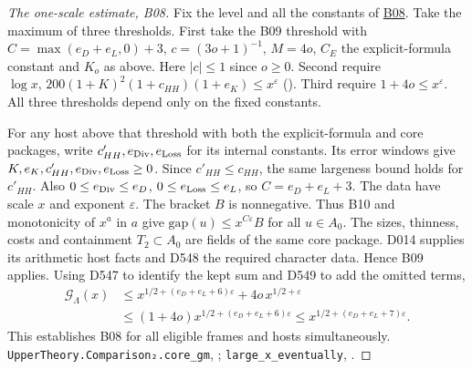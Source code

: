 \begin{proof}[The one-scale estimate, B08]
Fix the level and all the constants of \hyperref[sub:B08]{B08}. Take the
maximum of three thresholds. First take the B09 threshold with
$C=\max(e_D+e_L,0)+3$, $c=(3o+1)^{-1}$, $M=4o$, $C_E$ the
explicit-formula constant and $K_o$ as above. Here $|c|\le1$ since
$o\ge0$. Second require
$\log x,\,200(1+K)^2(1+c_{HH})(1+e_K)\le x^\varepsilon$
(). Third require $1+4o\le x^\varepsilon$.
All three thresholds depend only on the fixed constants.

For any host above that threshold with both the explicit-formula and
core packages, write $c'_{HH},e_{\rm Div},e_{\rm Loss}$ for its internal
constants. Its error windows give $K,e_K,c'_{HH},e_{\rm Div},e_{\rm Loss}\ge0$.
Since $c'_{HH}\le c_{HH}$, the same largeness bound holds for $c'_{HH}$.
Also $0\le e_{\rm Div}\le e_D$, $0\le e_{\rm Loss}\le e_L$,
so $C=e_D+e_L+3$. The data have scale $x$ and exponent $\varepsilon$.
The bracket $B$ is nonnegative. Thus B10 and monotonicity of $x^a$
in $a$ give $\mathrm{gap}(u)\le x^{C\varepsilon}B$ for all $u\in A_0$.
The sizes, thinness, costs and containment $T_2\subset A_0$ are fields
of the same core package. D014 supplies its arithmetic host facts and
D548 the required character data. Hence B09 applies.
Using D547 to identify the kept sum and D549 to add the omitted terms,
\begin{align*}
 \mathcal G_\Lambda(x)
   &\le x^{1/2+(e_D+e_L+6)\varepsilon}+4o\,x^{1/2+\varepsilon}\\
   &\le (1+4o)x^{1/2+(e_D+e_L+6)\varepsilon}
    \le x^{1/2+(e_D+e_L+7)\varepsilon}.
\end{align*}
This establishes B08 for all eligible frames and hosts simultaneously.
\nolinkurl{UpperTheory.Comparison₂.core_gm}, ;
\nolinkurl{large_x_eventually}, .
\end{proof}

